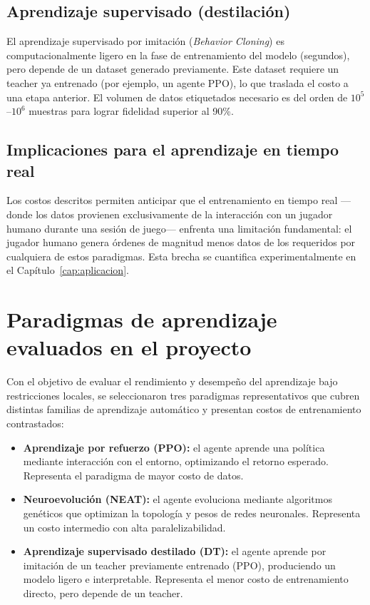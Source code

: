 \subsection{Aprendizaje supervisado (destilación)}

El aprendizaje supervisado por imitación (\textit{Behavior Cloning}) \cite{hussein2017imitation} es computacionalmente ligero en la fase de entrenamiento del modelo (segundos), pero depende de un dataset generado previamente. Este dataset requiere un teacher ya entrenado (por ejemplo, un agente PPO), lo que traslada el costo a una etapa anterior. El volumen de datos etiquetados necesario es del orden de $10^5$--$10^6$ muestras para lograr fidelidad superior al 90\%.

\subsection{Implicaciones para el aprendizaje en tiempo real}

Los costos descritos permiten anticipar que el entrenamiento en tiempo real ---donde los datos provienen exclusivamente de la interacción con un jugador humano durante una sesión de juego--- enfrenta una limitación fundamental: el jugador humano genera órdenes de magnitud menos datos de los requeridos por cualquiera de estos paradigmas. Esta brecha se cuantifica experimentalmente en el Capítulo~\ref{cap:aplicacion}.

\section{Paradigmas de aprendizaje evaluados en el proyecto}

Con el objetivo de evaluar el rendimiento y desempeño del aprendizaje bajo restricciones locales, se seleccionaron tres paradigmas representativos que cubren distintas familias de aprendizaje automático y presentan costos de entrenamiento contrastados:

\begin{itemize}
    \item \textbf{Aprendizaje por refuerzo (PPO):} el agente aprende una política mediante interacción con el entorno, optimizando el retorno esperado. Representa el paradigma de mayor costo de datos.
    \item \textbf{Neuroevolución (NEAT):} el agente evoluciona mediante algoritmos genéticos que optimizan la topología y pesos de redes neuronales. Representa un costo intermedio con alta paralelizabilidad.
    \item \textbf{Aprendizaje supervisado destilado (DT):} el agente aprende por imitación de un teacher previamente entrenado (PPO), produciendo un modelo ligero e interpretable. Representa el menor costo de entrenamiento directo, pero depende de un teacher.
\end{itemize}

